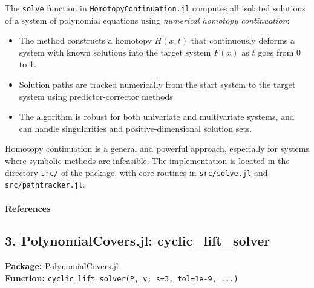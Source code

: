 \documentclass{article}
\begin{document}
The \texttt{solve} function in \texttt{HomotopyContinuation.jl} computes all isolated solutions of a system of polynomial equations using \emph{numerical homotopy continuation}:
\begin{itemize}
  \item The method constructs a homotopy $H(x, t)$ that continuously deforms a system with known solutions into the target system $F(x)$ as $t$ goes from 0 to 1.
  \item Solution paths are tracked numerically from the start system to the target system using predictor-corrector methods.
  \item The algorithm is robust for both univariate and multivariate systems, and can handle singularities and positive-dimensional solution sets.
\end{itemize}
Homotopy continuation is a general and powerful approach, especially for systems where symbolic methods are infeasible. The implementation is located in the directory \texttt{src/} of the package, with core routines in \texttt{src/solve.jl} and \texttt{src/pathtracker.jl}.

\paragraph{References}

\subsection*{3. PolynomialCovers.jl: cyclic\_lift\_solver}
\textbf{Package:} PolynomialCovers.jl\\
\textbf{Function:} \texttt{cyclic\_lift\_solver(P, y; s=3, tol=1e-9, ...)}
\end{document}
